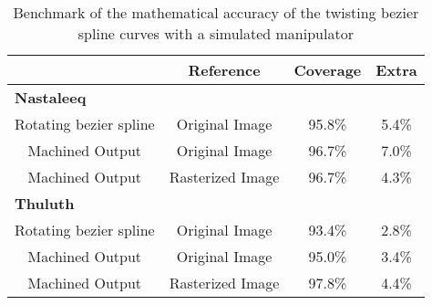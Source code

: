     \begin{table}
    \begin{center}
    \caption{Benchmark of the mathematical accuracy of the twisting bezier spline curves with a simulated manipulator}
    \label{Table:MachineDataMetrices}
    \begin{tabular}{| c | c | c | c |}
    \hline
      & \textbf{Reference} & \textbf{Coverage} & \textbf{Extra} \\
      \hline
      \multicolumn{4}{|l|}{\textbf{Nastaleeq}}\\
      \hline
      Rotating bezier spline & Original Image & 95.8\% & 5.4\% \\
      \hline
      Machined Output & Original Image & 96.7\% & 7.0\% \\
      \hline
      Machined Output & Rasterized Image & 96.7\% & 4.3\% \\
      \hline
      \multicolumn{4}{|l|}{\textbf{Thuluth}}\\
      \hline
      Rotating bezier spline & Original Image & 93.4\% & 2.8\% \\
      \hline
      Machined Output & Original Image & 95.0\% & 3.4\% \\
      \hline
      Machined Output & Rasterized Image & 97.8\% & 4.4\% \\
    \hline
    \end{tabular}
    \end{center}
    \end{table} 